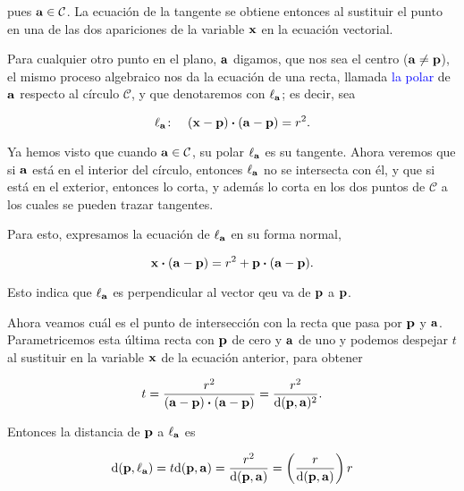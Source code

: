 \documentclass{article}
\theoremstyle{definicion}
\theoremstyle{definition}             %
\theoremstyle{definition}             %
\theoremstyle{definition}
\theoremstyle{definition}
\theoremstyle{observacion}
\theoremstyle{definition}
\theoremstyle{plain}
\theoremstyle{definition}
\theoremstyle{afirmacion}
\theoremstyle{notation}
\theoremstyle{definition}
\begin{document}
    pues \(\vb{a} \in \mathcal{C}\). La ecuación de la tangente se obtiene entonces al sustituir el punto en una de las dos apariciones de la variable \(\vb{x}\) en la ecuación vectorial.

    Para cualquier otro punto en el plano, \(\vb{a}\) digamos, que nos sea el centro (\(\vb{a} \neq \vb{p}\)), el mismo proceso algebraico nos da la ecuación de una recta, llamada \textcolor{blue}{la polar} de \(\vb{a}\) respecto al círculo \(\mathcal{C}\), y que denotaremos con \(\ell_{\vb{a}}\); es decir, sea

    \begin{equation*}
        \ell_{\vb{a}} \colon\quad (\vb{x} - \vb{p}) \vdot (\vb{a} - \vb{p}) = r^{2}.
    \end{equation*}

    Ya hemos visto que cuando \(\vb{a} \in \mathcal{C}\), su polar \(\ell_{\vb{a}}\) es su tangente. Ahora veremos que si \(\vb{a}\) está en el interior del círculo, entonces \(\ell_{\vb{a}}\) no se intersecta con él, y que si está en el exterior, entonces lo corta, y además lo corta en los dos puntos de \(\mathcal{C}\) a los cuales se pueden trazar tangentes.


    Para esto, expresamos la ecuación de \(\ell_{\vb{a}}\) en su forma normal, 

    \begin{equation*}
        \vb{x} \vdot (\vb{a} - \vb{p}) = r^{2} + \vb{p} \vdot (\vb{a} - \vb{p}).
    \end{equation*}

    Esto indica que \(\ell_{\vb{a}}\) es perpendicular al vector qeu va de \(\vb{p}\) a \(\vb{p}\).

    Ahora veamos cuál es el punto de intersección con la recta que pasa por \(\vb{p}\) y \(\vb{a}\). Parametricemos esta última recta con \(\vb{p}\) de cero y \(\vb{a}\) de uno y podemos despejar \(t\) al sustituir en la variable \(\vb{x}\) de la ecuación anterior, para obtener 

    \begin{equation*}
        t = \dfrac{r^{2}}{(\vb{a} - \vb{p}) \vdot (\vb{a} - \vb{p})} = \dfrac{r^{2}}{\textrm{d}(\vb{p}, \vb{a})^{2}}.
    \end{equation*}

    Entonces la distancia de \(\vb{p}\) a \(\ell_{\vb{a}}\) es 

    \begin{equation*}
        \textrm{d}(\vb{p}, \ell_{\vb{a}}) = t\textrm{d}(\vb{p}, \vb{a}) = \dfrac{r^{2}}{\textrm{d}(\vb{p}, \vb{a})} = \left(\dfrac{r}{\textrm{d}(\vb{p}, \vb{a})}\right)r
    \end{equation*}
\end{document}
